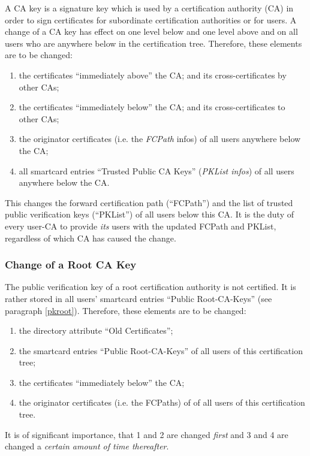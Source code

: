 A CA key is a signature key which is used by a certification authority (CA)
in order to sign certificates for subordinate certification authorities
or for users.
A change of a CA key has effect on one level below and one level above
and on all users who are anywhere below in the certification tree.
Therefore, these elements are to be changed:

\begin{enumerate}
\item the certificates ``immediately above'' the CA;
and its cross-certificates by other CAs;
\item the certificates ``immediately below'' the CA;
and its cross-certificates to other CAs;
\item the originator certificates (i.e. the {\em FCPath} infos) of
all users anywhere below the CA;
\item all smartcard entries ``Trusted Public CA Keys'' ({\em PKList infos}) of
all users anywhere below the CA.
\end{enumerate}

This changes the forward certification path (``FCPath'')
and the list of trusted public verification keys (``PKList'')
of all users below this CA.
It is the duty of every user-CA to provide {\em its}
users with the updated FCPath and PKList,
regardless of which CA has caused the change.

\subsubsection{Change of a Root CA Key}
\label{ops-crk}

The public verification key of a root certification authority is
not certified. It is rather stored in all users' smartcard entries
``Public Root-CA-Keys'' (see paragraph \ref{pkroot}).
Therefore, these elements are to be changed:

\begin{enumerate}
\item the directory attribute ``Old Certificates'';
\item the smartcard entries ``Public Root-CA-Keys''
of all users of this certification tree;
\item the certificates ``immediately below'' the CA;
\item the originator certificates (i.e. the FCPaths) of
of all users of this certification tree.
\end{enumerate}

It is of significant importance, that 1 and 2 are changed {\em first}
and 3 and 4 are changed a {\em certain amount of time thereafter}.

